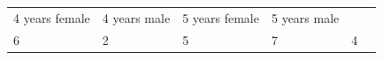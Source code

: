 \begin{enumerate}[noitemsep, label=\textbf{\arabic*}. ]
{{\begin{center}
\begin{xtabular}[t]{|l|l|l|l|l|l|}
    
        4 years female &
    
    
        4
years male &
    
    
        5 years female &
    
    
        5 years male%
     \tabularnewline{}
    
    
        6 &
    
    
        2 &
    
    
        5 &
    
    
        7 &
    
    
        4 &
    

\end{xtabular}
\end{center}}}
\end{enumerate}
